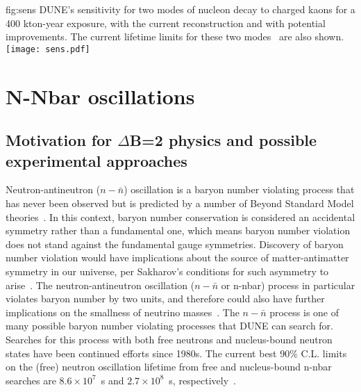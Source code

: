 \begin{dunefigure}
{fig:sens}
{DUNE's sensitivity for two modes of nucleon decay to charged kaons for a 400 kton-year exposure, with the current reconstruction and with potential improvements.  The current lifetime limits for these two modes~\cite{Abe:2014mwa,Berger:1991fa} are also shown.}
\texttt{[image: sens.pdf]}
\end{dunefigure} 


\section{N-Nbar oscillations}
\label{sec:nonaccel-nnbar}

\subsection{Motivation for $\Delta$B=2 physics and possible experimental approaches}
\label{subsec:nonaccel-nnbar-intro}

Neutron-antineutron ($n - \bar{n}$) oscillation is a baryon number violating process that
has never been observed but is predicted by a number of Beyond Standard Model
theories~\cite{Phillips:2014fgb}. In this context, baryon number conservation is considered an accidental
symmetry rather than a fundamental one, which means baryon number violation
does not stand against the fundamental gauge symmetries. Discovery of baryon
number violation would have implications about the source of matter-antimatter
symmetry in our universe, per Sakharov's conditions for such asymmetry to arise~\cite{Sakharov:1967dj}.
The neutron-antineutron oscillation ($n-\bar{n}$ or n-nbar) process in particular violates
baryon number by two units, and therefore could also have further implications on
the smallness of neutrino masses~\cite{Phillips:2014fgb}. The $n - \bar{n}$ process is one of many possible baryon number violating processes that DUNE can search for. Searches for this process with
both free neutrons and nucleus-bound neutron states have been continued efforts
since 1980s. The current best 90\% C.L. limits on the (free) neutron oscillation
lifetime from free and nucleus-bound n-nbar searches are $8.6\times10^7$~s and $2.7\times 10^8$~s, respectively~\cite{BaldoCeolin:1994jz,Abe:2011ky}.

